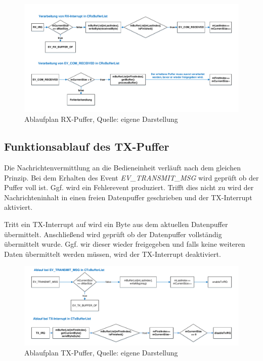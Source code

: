 \documentclass{article}
\begin{document}
\begin{figure}[h]
	\includegraphics[width=\linewidth]{PAP_RxPuffer}
	\caption{Ablaufplan RX-Puffer, Quelle: eigene Darstellung}
\end{figure}

\subsection*{Funktionsablauf des TX-Puffer}
Die Nachrichtenvermittlung an die Bedieneinheit verläuft nach dem gleichen Prinzip. Bei dem Erhalten des Event \textit{EV\_TRANSMIT\_MSG} wird geprüft ob der Puffer voll ist. Ggf. wird ein Fehlerevent produziert. Trifft dies nicht zu wird der Nachrichteninhalt in einen freien Datenpuffer geschrieben und der TX-Interrupt aktiviert.

Tritt ein TX-Interrupt auf wird ein Byte aus dem aktuellen Datenpuffer übermittelt. Anschließend wird geprüft ob der Datenpuffer vollständig übermittelt wurde. Ggf. wir dieser wieder freigegeben und falls keine weiteren Daten übermittelt werden müssen, wird der TX-Interrupt deaktiviert.

\begin{figure}[h]
	\includegraphics[width=\linewidth]{PAP_TxPuffer}
	\caption{Ablaufplan TX-Puffer, Quelle: eigene Darstellung}
\end{figure}

\newpage
\end{document}
